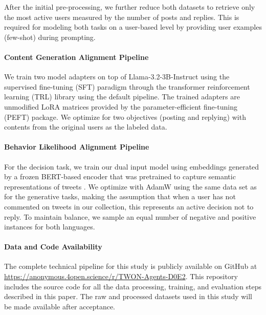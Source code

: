 After the initial pre-processing, we further reduce both datasets to retrieve only the most active users measured by the number of posts and replies. This is required for modeling both tasks on a user-based level by providing user examples (few-shot) during prompting.

\paragraph{Content Generation Alignment Pipeline}
\label{subsec:training}
We train two model adapters on top of Llama-3.2-3B-Instruct \citep{dubey2024llama} using the supervised fine-tuning (SFT) paradigm through the transformer reinforcement learning (TRL) library using the default pipeline. The trained adapters are unmodified LoRA \citep{hu2021lora} matrices provided by the parameter-efficient fine-tuning (PEFT) package. We optimize for two objectives (posting and replying) with contents from the original users as the labeled data.

\paragraph{Behavior Likelihood Alignment Pipeline}
For the decision task, we train our dual input model using embeddings generated by a frozen BERT-based encoder that was pretrained to capture semantic representations of tweets \citep{zhang2023twhin}. We optimize with AdamW \citep{loshchilov2017fixing} using the same data set as for the generative tasks, making the assumption that when a user has not commented on tweets in our collection, this represents an active decision not to reply. To maintain balance, we sample an equal number of negative and positive instances for both languages.

\paragraph{Data and Code Availability}
The complete technical pipeline for this study is publicly available on GitHub at \url{https://anonymous.4open.science/r/TWON-Agents-D0E2}. This repository includes the source code for all the data processing, training, and evaluation steps described in this paper. The raw and processed datasets used in this study will be made available after acceptance.

